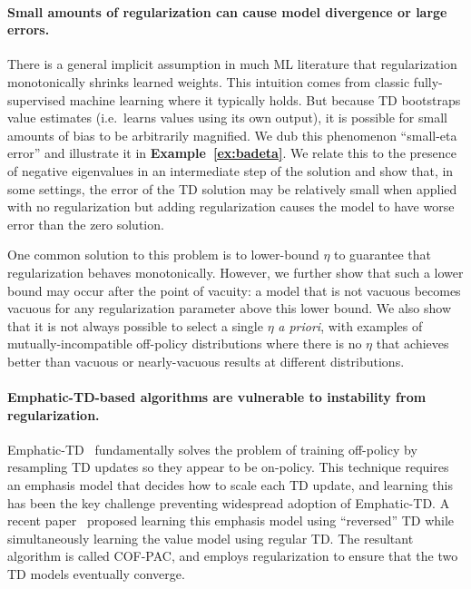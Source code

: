 \paragraph{Small amounts of regularization can cause model divergence or large errors. }
There is a general implicit assumption in much ML literature that regularization monotonically shrinks learned weights. This intuition comes from classic fully-supervised machine learning where it typically holds. But because TD bootstraps value estimates (i.e.\ learns values using its own output), it is possible for small amounts of bias to be arbitrarily magnified. We dub this phenomenon ``small-eta error'' and illustrate it in \textbf{Example~\ref{ex:badeta}}. We relate this to the presence of negative eigenvalues in an intermediate step of the solution and %
show that, in some settings, the error of the TD solution may be relatively small when applied with no regularization but adding regularization causes the model to have worse error than the zero solution.

One common solution to this problem is to lower-bound $\eta$ to guarantee that regularization behaves monotonically. However, we further show that such a lower bound may occur after the point of vacuity: a model that is not vacuous becomes vacuous for any regularization parameter above this lower bound. We also show that it is not always possible to select a single $\eta$ \emph{a priori}, with examples of mutually-incompatible off-policy distributions where there is no $\eta$ that achieves better than vacuous or nearly-vacuous results at different distributions.


\paragraph{Emphatic-TD-based algorithms are vulnerable to instability from regularization.  }
Emphatic-TD~\cite{sutton2016emphatic} fundamentally solves the problem of training off-policy by resampling TD updates so they appear to be on-policy.  This technique requires an emphasis model that decides how to scale each TD update, and learning this has been the key challenge preventing widespread adoption of Emphatic-TD.  A recent paper~\cite{zhang2020provably} proposed learning this emphasis model using ``reversed'' TD while simultaneously learning the value model using regular TD.  The resultant algorithm is called COF-PAC, and employs regularization to ensure that the two TD models eventually converge.

